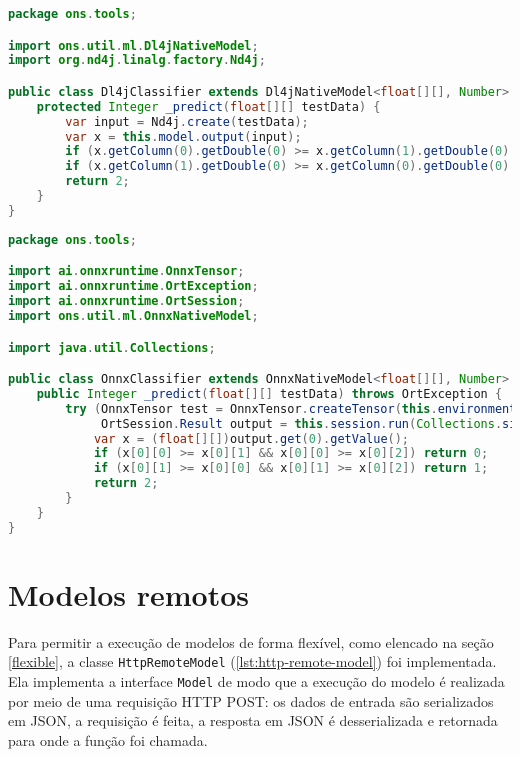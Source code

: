 \begin{lstlisting}[language=Java, caption=Implementação da classe Dl4jClassifier, label={lst:dl4j-classifier}]
package ons.tools;

import ons.util.ml.Dl4jNativeModel;
import org.nd4j.linalg.factory.Nd4j;

public class Dl4jClassifier extends Dl4jNativeModel<float[][], Number> {
    protected Integer _predict(float[][] testData) {
        var input = Nd4j.create(testData);
        var x = this.model.output(input);
        if (x.getColumn(0).getDouble(0) >= x.getColumn(1).getDouble(0) && x.getColumn(0).getDouble(0) >= x.getColumn(2).getDouble(0)) return 0;
        if (x.getColumn(1).getDouble(0) >= x.getColumn(0).getDouble(0) && x.getColumn(1).getDouble(0) >= x.getColumn(2).getDouble(0)) return 1;
        return 2;
    }
}
\end{lstlisting}

\begin{lstlisting}[language=Java, caption=Implementação da classe OnnxClassifier, label={lst:onnx-classifier}]
package ons.tools;

import ai.onnxruntime.OnnxTensor;
import ai.onnxruntime.OrtException;
import ai.onnxruntime.OrtSession;
import ons.util.ml.OnnxNativeModel;

import java.util.Collections;

public class OnnxClassifier extends OnnxNativeModel<float[][], Number> {
    public Integer _predict(float[][] testData) throws OrtException {
        try (OnnxTensor test = OnnxTensor.createTensor(this.environment, testData);
             OrtSession.Result output = this.session.run(Collections.singletonMap(this.inputName, test))) {
            var x = (float[][])output.get(0).getValue();
            if (x[0][0] >= x[0][1] && x[0][0] >= x[0][2]) return 0;
            if (x[0][1] >= x[0][0] && x[0][1] >= x[0][2]) return 1;
            return 2;
        }
    }
}
\end{lstlisting}



\section{Modelos remotos}
\label{appendix-ons-remote-model}

Para permitir a execução de modelos de forma flexível, como elencado na seção \ref{flexible}, a classe \texttt{HttpRemoteModel} (\ref{lst:http-remote-model}) foi implementada. Ela implementa a interface \texttt{Model} de modo que a execução do modelo é realizada por meio de uma requisição HTTP POST: os dados de entrada são serializados em JSON, a requisição é feita, a resposta em JSON é desserializada e retornada para onde a função foi chamada.


